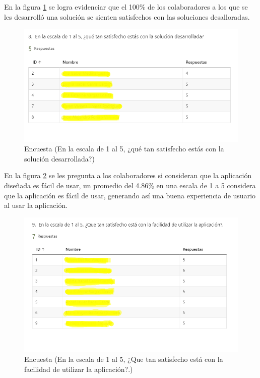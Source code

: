 En la figura \ref{fig:satisfecho} se logra evidenciar que el 100\% de los colaboradores a los que se les desarrolló una solución se sienten satisfechos con las soluciones desalloradas.
\begin{figure}[H]
	\centering
	\includegraphics[scale=0.4]{Capitulo5/imagenes/9}
	\caption{Encuesta (En la escala de 1 al 5, ¿qué tan satisfecho estás con la solución desarrollada?)}
	\label{fig:satisfecho}
\end{figure}

En la figura \ref{fig:aplica} se les pregunta a los colaboradores si consideran que la aplicación diseñada es fácil de usar, un promedio del 4.86\% en una escala de 1 a 5 considera que la aplicación es fácil de usar, generando así una buena experiencia de usuario al usar la aplicación.
\begin{figure}[H]
	\centering
	\includegraphics[scale=0.4]{Capitulo5/imagenes/10}
	\caption{Encuesta (En la escala de 1 al 5, ¿Que tan satisfecho está con la facilidad de utilizar la aplicación?.)}
	\label{fig:aplica}
\end{figure}


